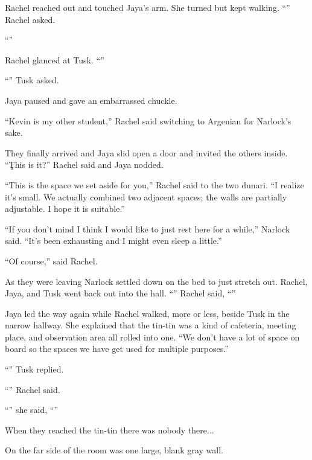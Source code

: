 Rachel reached out and touched Jaya's arm. She turned but kept walking. ``''
Rachel asked.

``''

Rachel glanced at Tusk. ``''

``'' Tusk asked.

Jaya paused and gave an embarrassed chuckle.

``Kevin is my other student,'' Rachel said switching to Argenian for Narlock's sake.

They finally arrived and Jaya slid open a door and invited the others inside. ``\c{This is
  it?}'' Rachel said and Jaya nodded.

``This is the space we set aside for you,'' Rachel said to the two dunari. ``I realize it's
small. We actually combined two adjacent spaces; the walls are partially adjustable. I hope it
is suitable.''


``If you don't mind I think I would like to just rest here for a while,'' Narlock said. ``It's
been exhausting and I might even sleep a little.''

``Of course,'' said Rachel.

As they were leaving Narlock settled down on the bed to just stretch out. Rachel, Jaya, and Tusk
went back out into the hall. ``'' Rachel said, ``''

Jaya led the way again while Rachel walked, more or less, beside Tusk in the narrow hallway. She
explained that the tin-tin was a kind of cafeteria, meeting place, and observation area all
rolled into one. ``We don't have a lot of space on board so the spaces we have get used for
multiple purposes.''

``'' Tusk replied.

``'' Rachel said.

``'' she said, ``''

When they reached the tin-tin there was nobody there...


On the far side of the room was one large, blank gray wall.


